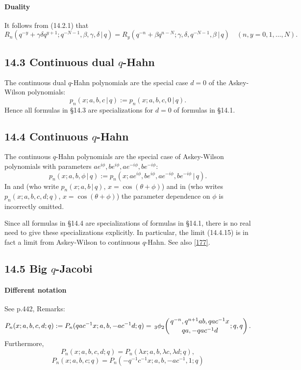 \documentclass[twoside,11pt]{article}
\newcommand\be\beta
\newcommand\ga\gamma
\newcommand\de\delta
\newcommand\tha\theta
\newcommand\la\lambda
\newcommand{\qhyp}[5]{\,\mbox{}_{#1}\phi_{#2}\!\left(
  \genfrac{}{}{0pt}{}{#3}{#4};#5\right)}
\begin{document}
\paragraph{Duality}
It follows from (14.2.1) that
\begin{equation}
R_n(q^{-y}+\ga\de q^{y+1};q^{-N-1},\be,\ga,\de\,|\, q)
=R_y(q^{-n}+\be q^{n-N};\ga,\de,q^{-N-1},\be\,|\, q)\quad
(n,y=0,1,\ldots,N).
\end{equation}
%
\subsection*{14.3 Continuous dual $q$-Hahn}
\label{sec14.3}
The continuous dual $q$-Hahn polynomials are the special case $d=0$ of the
Askey-Wilson polynomials:
\[
p_n(x;a,b,c\,|\, q):=p_n(x;a,b,c,0\,|\, q).
\]
Hence all formulas in \S14.3 are specializations for $d=0$ of formulas in \S14.1.
%
\subsection*{14.4 Continuous $q$-Hahn}
\label{sec14.4}
The continuous $q$-Hahn polynomials are the special case
of Askey-Wilson polynomials with parameters
$a e^{i\phi},b e^{i\phi},a e^{-i\phi},b e^{-i\phi}$:
\[
p_n(x;a,b,\phi\,|\, q):=
p_n(x;a e^{i\phi},b e^{i\phi},a e^{-i\phi},b e^{-i\phi}\,|\, q).
\]
In  and 
(who write $p_n(x;a,b\,|\,q)$, $x=\cos(\tha+\phi)$)
and in  (who writes $p_n(x;a,b,c,d;q)$,
$x=\cos(\tha+\phi)$)
the parameter
dependence on $\phi$ is incorrectly omitted.

Since all formulas in \S14.4 are specializations of formulas in \S14.1,
there is no real need to give these specializations explicitly.
In particular, the limit (14.4.15) is in fact a limit from Askey-Wilson to
continuous $q$-Hahn. See also \eqref{177}.
%
\subsection*{14.5 Big $q$-Jacobi}
\label{sec14.5}
%
\paragraph{Different notation}
See p.442, Remarks:
\begin{equation}
P_n(x;a,b,c,d;q):=P_n(qac^{-1}x;a,b,-ac^{-1}d;q)
=\qhyp32{q^{-n},q^{n+1}ab,qac^{-1}x}{qa,-qac^{-1}d}{q,q}.
\label{123}
\end{equation}
Furthermore,
\begin{equation}
P_n(x;a,b,c,d;q)=P_n(\la x;a,b,\la c,\la d;q),
\label{141}
\end{equation}
\begin{equation}
P_n(x;a,b,c;q)=P_n(-q^{-1}c^{-1}x;a,b,-ac^{-1},1;q)
\label{142}
\end{equation}
%
\end{document}
